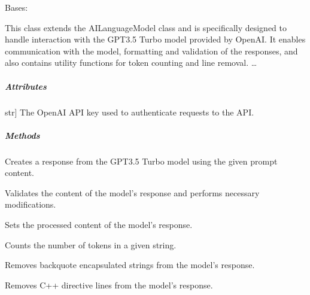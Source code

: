 \documentclass[letterpaper,10pt,english]{sphinxmanual}
\begin{document}
\begin{fulllineitems}
\label{\detokenize{main.ai_language_model.models:main.ai_language_model.models.gpt_3_5_turbo.GPT3_5TurboModel}}
\pysigstartsignatures
{}
\pysigstopsignatures
\sphinxAtStartPar
Bases: 

\sphinxAtStartPar
This class extends the AILanguageModel class and is specifically designed to
handle interaction with the GPT\sphinxhyphen{}3.5 Turbo model provided by OpenAI. It enables
communication with the model, formatting and validation of the responses, and
also contains utility functions for token counting and line removal.
…


\subparagraph{Attributes}
\label{\detokenize{main.ai_language_model.models:attributes}}\begin{description}
\sphinxlineitem{\_\_api\_key}{[}str{]}
\sphinxAtStartPar
The OpenAI API key used to authenticate requests to the API.

\end{description}


\subparagraph{Methods}
\label{\detokenize{main.ai_language_model.models:methods}}\begin{description}
\sphinxAtStartPar
Creates a response from the GPT\sphinxhyphen{}3.5 Turbo model using the given prompt content.

\sphinxAtStartPar
Validates the content of the model’s response and performs necessary modifications.

\sphinxAtStartPar
Sets the processed content of the model’s response.

\sphinxAtStartPar
Counts the number of tokens in a given string.

\sphinxAtStartPar
Removes backquote encapsulated strings from the model’s response.

\sphinxAtStartPar
Removes C++ directive lines from the model’s response.


\end{description}
\end{fulllineitems}
\end{document}
